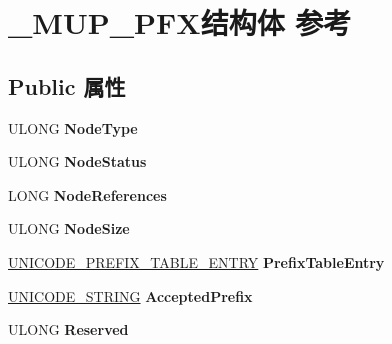 \hypertarget{struct___m_u_p___p_f_x}{}\section{\+\_\+\+M\+U\+P\+\_\+\+P\+F\+X结构体 参考}
\label{struct___m_u_p___p_f_x}
\subsection*{Public 属性}
\begin{DoxyCompactItemize}
\item 
\mbox{\label{struct___m_u_p___p_f_x_ae596c1259104505c0076c63a343ae1bd}} 
U\+L\+O\+NG {\bfseries Node\+Type}
\item 
\mbox{\label{struct___m_u_p___p_f_x_a8cdac5a1e5f9885b26a085c7c5094740}} 
U\+L\+O\+NG {\bfseries Node\+Status}
\item 
\mbox{\label{struct___m_u_p___p_f_x_ad37243c698d8c03d0d459022ccdf890f}} 
L\+O\+NG {\bfseries Node\+References}
\item 
\mbox{\label{struct___m_u_p___p_f_x_ad9371774deb8d4879afac68a1788ff6c}} 
U\+L\+O\+NG {\bfseries Node\+Size}
\item 
\mbox{\label{struct___m_u_p___p_f_x_aa63ace197df98fcfe16f627ea4726683}} 
\hyperlink{struct___u_n_i_c_o_d_e___p_r_e_f_i_x___t_a_b_l_e___e_n_t_r_y}{U\+N\+I\+C\+O\+D\+E\+\_\+\+P\+R\+E\+F\+I\+X\+\_\+\+T\+A\+B\+L\+E\+\_\+\+E\+N\+T\+RY} {\bfseries Prefix\+Table\+Entry}
\item 
\mbox{\label{struct___m_u_p___p_f_x_a6cf85e0407d9de30ba33fad6cada685d}} 
\hyperlink{struct___u_n_i_c_o_d_e___s_t_r_i_n_g}{U\+N\+I\+C\+O\+D\+E\+\_\+\+S\+T\+R\+I\+NG} {\bfseries Accepted\+Prefix}
\item 
\mbox{\label{struct___m_u_p___p_f_x_a17100a038f5064bbc99ab5fb46c5dfc3}} 
U\+L\+O\+NG {\bfseries Reserved}
\item 
\mbox{\label{struct___m_u_p___p_f_x_af142ecb6e113b55f9b04cab8b420bab1}} 

\end{DoxyCompactItemize}
